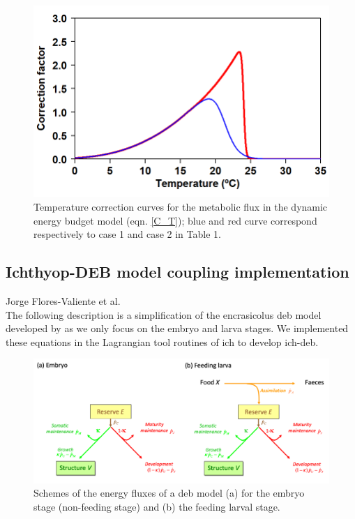 \begin{figure}[ht]
	\includegraphics[width=1.0\textwidth]{figures/Chap3CT_curves.png}
	\centering
	\caption{Temperature correction curves for the metabolic flux in the dynamic energy budget model (eqn. \ref{C_T}); blue and red curve correspond respectively to case 1 and case 2 in Table 1.}
	\label{Chap3CT_curves}
\end{figure}

\subsection{Ichthyop-DEB model coupling implementation}\label{Chap3Ich-DEBstd}

Jorge Flores-Valiente et al.\\

The following description is a simplification of the \gls{encrasicolus} \acrshort{deb} model developed by \cite{PethRoos2013} as we only focus on the embryo and larva stages. We implemented these equations in the Lagrangian tool routines of \gls{ich} \citep{LettVerl2008} to develop \gls{ich-deb}.\\

\begin{figure}[ht]
	\includegraphics[width=1.0\textwidth]{figures/Chap3DEBflux.png}
	\centering
	\caption{Schemes of the energy fluxes of a \acrlong{deb} model (a) for the embryo stage (non-feeding stage) and (b) the feeding larval stage.}
	\label{Chap3DEBflux}
\end{figure}

